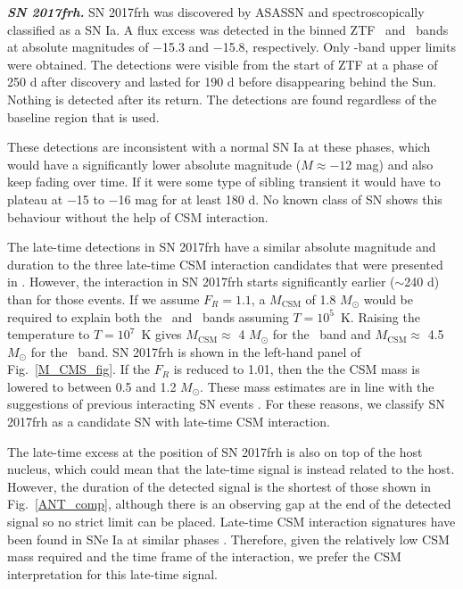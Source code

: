 \documentclass[a4paper,oneside,12pt, class=Latex/Classes/PhDthesisPSnPDF, crop=false]{standalone}
\begin{document}
\textit{\textbf{SN 2017frh.}}
SN 2017frh was discovered by ASASSN and spectroscopically classified as a SN Ia. A flux excess was detected in the binned ZTF \ztfg~and \ztfr~bands at absolute magnitudes of $-$15.3 and $-$15.8, respectively. Only \ztfi-band upper limits were obtained. The detections were visible from the start of ZTF at a phase of 250 d after discovery and lasted for 190 d before disappearing behind the Sun. Nothing is detected after its return. The detections are found regardless of the baseline region that is used.

These detections are inconsistent with a normal SN Ia at these phases, which would have a significantly lower absolute magnitude ($M\approx-12$ mag) and also keep fading over time. If it were some type of sibling transient it would have to plateau at $-$15 to $-$16 mag for at least 180 d. No known class of SN shows this behaviour without the help of CSM interaction.

The late-time detections in SN 2017frh have a similar absolute magnitude and duration to the three late-time CSM interaction candidates that were presented in \citet{Terwel_2024_paper1}. However, the interaction in SN 2017frh starts significantly earlier ($\sim$240 d) than for those events. If we assume $F_R = 1.1$, a $M_\text{CSM}$ of 1.8 $M_\odot$ would be required to explain both the \ztfg\ and \ztfr\ bands assuming $T=10^5$~K. Raising the temperature to $T=10^7$~K gives $M_\text{CSM}\approx$ 4 $M_\odot$ for the \ztfg\ band and $M_\text{CSM}\approx$ 4.5 $M_\odot$ for the \ztfr\ band. SN 2017frh is shown in the left-hand panel of Fig.~\ref{M_CMS_fig}. If the $F_R$ is reduced to 1.01, then the the CSM mass is lowered to between 0.5 and 1.2 $M_\odot$. These mass estimates are in line with the suggestions of previous interacting SN events \citep{PTF11kx, Inserra_2016}. For these reasons, we classify SN 2017frh as a candidate SN with late-time CSM interaction.

The late-time excess at the position of SN 2017frh is also on top of the host nucleus, which could mean that the late-time signal is instead related to the host. However, the duration of the detected signal is the shortest of those shown in Fig.~\ref{ANT_comp}, although there is an observing gap at the end of the detected signal so no strict limit can be placed. Late-time CSM interaction signatures have been found in SNe Ia at similar phases \citep{2015cp}. Therefore, given the relatively low CSM mass required and the time frame of the interaction, we prefer the CSM interpretation for this late-time signal.\\
\end{document}
